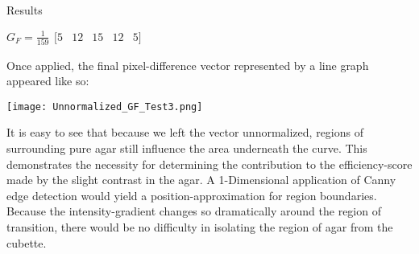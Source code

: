 \documentclass[a4paper,12pt]{article}
\begin{document}
\begin{section}{Results}
\begin{center}
$G_F = \frac{1}{159}
\begin{matrix}
[ 5 & 12 & 15 & 12 & 5 ]
\end{matrix}$
\end{center}
	
Once applied, the final pixel-difference vector represented by a line graph appeared like so:

\begin{center}
\texttt{[image: Unnormalized\_GF\_Test3.png]}
\end{center}

It is easy to see that because we left the vector unnormalized, regions of surrounding pure agar still influence the area underneath the curve. This demonstrates the necessity for determining the contribution to the efficiency-score made by the slight contrast in the agar. A 1-Dimensional application of Canny edge detection would yield a position-approximation for region boundaries. Because the intensity-gradient changes so dramatically around the region of transition, there would be no difficulty in isolating the region of agar from the cubette.

\end{section}
\end{document}
